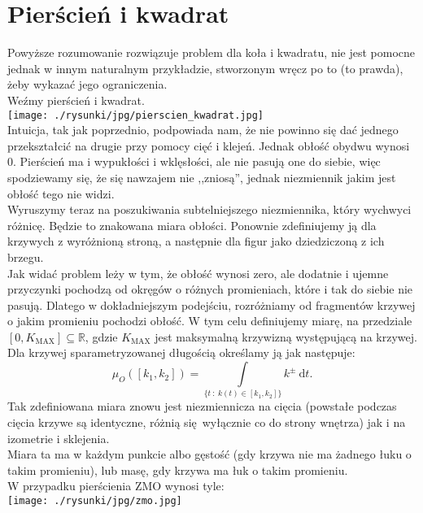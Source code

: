 \documentclass[a4paper, 12pt, twosided]{article}
\newcommand{\smalltodoII}[1]{\hfill \break \textbf{\ \textcolor{violet}{To do: #1}}\hfill \break}
\newcommand{\rysunek}[1]{\hfill \break\\[16pt] \Huge \textbf{\textcolor{violet}{Brakujący rysunek 
\normalsize
#1}} \hfill
\break \\[16pt] \normalsize}
\begin{document}
\section{Pierścień i kwadrat}\label{ZMO}
Powyższe rozumowanie rozwiązuje problem dla koła i kwadratu, nie jest pomocne jednak w innym 
naturalnym
przykładzie, stworzonym wręcz po to (to prawda), żeby wykazać jego ograniczenia. \\
Weźmy pierścień i kwadrat. \\
\texttt{[image: ./rysunki/jpg/pierscien\_kwadrat.jpg]} \\
Intuicja, tak jak poprzednio, podpowiada nam, że nie powinno się dać jednego przekształcić na drugie
przy pomocy cięć i klejeń. Jednak obłość obydwu wynosi $0$.
Pierścień ma i wypukłości i wklęsłości, ale nie pasują one do siebie, więc spodziewamy się, że się 
nawzajem
nie ,,zniosą'', jednak niezmiennik jakim jest obłość tego nie widzi. \\
Wyruszymy teraz na poszukiwania subtelniejszego niezmiennika, który 
wychwyci różnicę. Będzie to
znakowana miara obłości. Ponownie zdefiniujemy ją dla krzywych z wyróżnioną stroną, a następnie
dla figur jako dziedziczoną z ich brzegu. \\
Jak widać problem leży w tym, że obłość wynosi zero, ale dodatnie i ujemne przyczynki pochodzą od 
okręgów
o różnych promieniach, które i tak do siebie nie pasują. Dlatego w dokładniejszym podejściu, 
rozróżniamy
od fragmentów krzywej o jakim promieniu pochodzi obłość. W tym celu definiujemy miarę, na przedziale
$[0, K_\text{MAX}] \subseteq \mathbb{R}$, gdzie $K_\text{MAX}$ jest maksymalną krzywizną 
 występującą 
na 
krzywej. Dla krzywej sparametryzowanej długością określamy ją jak następuje:
\begin{equation}
    \mu_O([k_1, k_2]) = \displaystyle\int\limits_{\{t\ :\ k(t) \in [k_1, k_2]\}}
    k^\pm\ \textrm{d}t.\label{ZMO_def}
\end{equation}
Tak zdefiniowana miara znowu jest niezmiennicza na cięcia (powstałe podczas cięcia krzywe są 
identyczne, różnią 
się wyłącznie co do
strony wnętrza) jak i na izometrie i sklejenia. \\
Miara ta ma w każdym punkcie albo gęstość (gdy krzywa nie ma żadnego łuku o takim promieniu), lub 
 masę, gdy 
krzywa ma łuk o takim promieniu. \\
W przypadku pierścienia ZMO wynosi tyle: \\
\texttt{[image: ./rysunki/jpg/zmo.jpg]} \\
\end{document}
